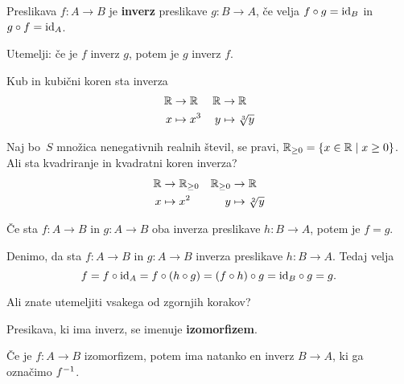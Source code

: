 \begin{definicija}
  Preslikava $f : A \to B$ je \textbf{inverz} preslikave $g : B \to A$, če velja $f \circ g = \id[B]$ in $g \circ f = \id[A]$.
\end{definicija}

\begin{naloga}
  Utemelji: če je $f$ inverz $g$, potem je $g$ inverz $f$.
\end{naloga}

\begin{primer}
  Kub in kubični koren sta inverza
  \begin{align*}
    \RR &\to \RR    &     \RR &\to \RR \\
    x &\mapsto x^3  &     y &\mapsto \sqrt[3]{y}
  \end{align*}
\end{primer}

\begin{naloga}
  Naj bo~$S$ množica nenegativnih realnih števil, se pravi, $\RR_{\geq 0} = \{x \in \RR \mid x \geq 0\}$. Ali sta kvadriranje in kvadratni koren inverza?
  \begin{align*}
    \RR &\to \RR_{\geq 0}    &     \RR_{\geq 0} &\to \RR \\
    x &\mapsto x^2           &     y &\mapsto \sqrt[2]{y}
  \end{align*}
\end{naloga}

\begin{izjava}
  Če sta $f : A \to B$ in $g : A \to B$ oba inverza preslikave $h : B \to A$, potem je $f = g$.
\end{izjava}

\begin{dokaz}
  Denimo, da sta $f : A \to B$ in $g : A \to B$ inverza preslikave $h : B \to A$. Tedaj velja
  \begin{equation*}
    f =
    f \circ \id[A] =
    f \circ (h \circ g) =
    (f \circ h) \circ g =
    \id[B] \circ g =
    g.
  \end{equation*}
\end{dokaz}

Ali znate utemeljiti vsakega od zgornjih korakov?

\begin{definicija}
  Presikava, ki ima inverz, se imenuje \textbf{izomorfizem}.
\end{definicija}

Če je $f : A \to B$ izomorfizem, potem ima natanko en inverz $B \to A$, ki ga označimo $\inv{f}$.

